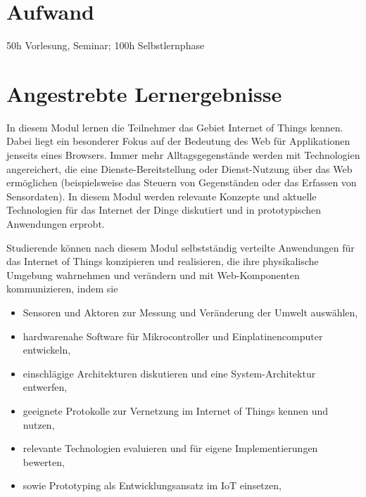 \hypertarget{aufwandpathlabelmi-2017modulbeschreibungen-bachelorba_wd_internet-of-things}{%
\section*{Aufwand\label{/mi-2017/modulbeschreibungen-bachelor/BA_WD_Internet-of-things}}\label{aufwandpathlabelmi-2017modulbeschreibungen-bachelorba_wd_internet-of-things}}

50h Vorlesung, Seminar; 100h Selbstlernphase

\hypertarget{angestrebte-lernergebnissepathlabelmi-2017modulbeschreibungen-bachelorba_wd_internet-of-things}{%
\section*{Angestrebte
Lernergebnisse\label{/mi-2017/modulbeschreibungen-bachelor/BA_WD_Internet-of-things}}\label{angestrebte-lernergebnissepathlabelmi-2017modulbeschreibungen-bachelorba_wd_internet-of-things}}

In diesem Modul lernen die Teilnehmer das Gebiet Internet of Things
kennen. Dabei liegt ein besonderer Fokus auf der Bedeutung des Web für
Applikationen jenseits eines Browsers. Immer mehr Alltagsgegenstände
werden mit Technologien angereichert, die eine Dienste-Bereitstellung
oder Dienst-Nutzung über das Web ermöglichen (beispielsweise das Steuern
von Gegenständen oder das Erfassen von Sensordaten). In diesem Modul
werden relevante Konzepte und aktuelle Technologien für das Internet der
Dinge diskutiert und in prototypischen Anwendungen erprobt.

Studierende können nach diesem Modul selbstständig verteilte Anwendungen
für das Internet of Things konzipieren und realisieren, die ihre
physikalische Umgebung wahrnehmen und verändern und mit Web-Komponenten
kommunizieren, indem sie

\begin{itemize}
\tightlist
\item
  Sensoren und Aktoren zur Messung und Veränderung der Umwelt auswählen,
\item
  hardwarenahe Software für Mikrocontroller und Einplatinencomputer
  entwickeln,
\item
  einschlägige Architekturen diskutieren und eine System-Architektur
  entwerfen,
\item
  geeignete Protokolle zur Vernetzung im Internet of Things kennen und
  nutzen,
\item
  relevante Technologien evaluieren und für eigene Implementierungen
  bewerten,
\item
  sowie Prototyping als Entwicklungsansatz im IoT einsetzen,
\end{itemize}


